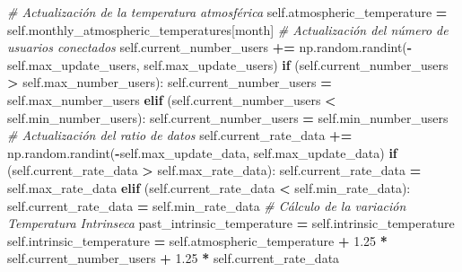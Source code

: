 \documentclass[
]{book}
\newenvironment{Shaded}{\begin{snugshade}}{\end{snugshade}}
\newcommand{\CommentTok}[1]{\textcolor[rgb]{0.56,0.35,0.01}{\textit{#1}}}
\newcommand{\ControlFlowTok}[1]{\textcolor[rgb]{0.13,0.29,0.53}{\textbf{#1}}}
\newcommand{\FloatTok}[1]{\textcolor[rgb]{0.00,0.00,0.81}{#1}}
\newcommand{\NormalTok}[1]{#1}
\newcommand{\OperatorTok}[1]{\textcolor[rgb]{0.81,0.36,0.00}{\textbf{#1}}}
\newcommand{\VariableTok}[1]{\textcolor[rgb]{0.00,0.00,0.00}{#1}}
\begin{document}
\begin{Shaded}
\begin{Highlighting}[]
        \CommentTok{\# Actualización de la temperatura atmosférica}
        \VariableTok{self}\NormalTok{.atmospheric\_temperature }\OperatorTok{=} \VariableTok{self}\NormalTok{.monthly\_atmospheric\_temperatures[month]}
        \CommentTok{\# Actualización del número de usuarios conectados}
        \VariableTok{self}\NormalTok{.current\_number\_users }\OperatorTok{+=}\NormalTok{ np.random.randint(}\OperatorTok{{-}}\VariableTok{self}\NormalTok{.max\_update\_users,}
                                                       \VariableTok{self}\NormalTok{.max\_update\_users)}
        \ControlFlowTok{if}\NormalTok{ (}\VariableTok{self}\NormalTok{.current\_number\_users }\OperatorTok{\textgreater{}} \VariableTok{self}\NormalTok{.max\_number\_users):}
            \VariableTok{self}\NormalTok{.current\_number\_users }\OperatorTok{=} \VariableTok{self}\NormalTok{.max\_number\_users}
        \ControlFlowTok{elif}\NormalTok{ (}\VariableTok{self}\NormalTok{.current\_number\_users }\OperatorTok{\textless{}} \VariableTok{self}\NormalTok{.min\_number\_users):}
            \VariableTok{self}\NormalTok{.current\_number\_users }\OperatorTok{=} \VariableTok{self}\NormalTok{.min\_number\_users}
        \CommentTok{\# Actualización del ratio de datos}
        \VariableTok{self}\NormalTok{.current\_rate\_data }\OperatorTok{+=}\NormalTok{ np.random.randint(}\OperatorTok{{-}}\VariableTok{self}\NormalTok{.max\_update\_data,}
                                                    \VariableTok{self}\NormalTok{.max\_update\_data)}
        \ControlFlowTok{if}\NormalTok{ (}\VariableTok{self}\NormalTok{.current\_rate\_data }\OperatorTok{\textgreater{}} \VariableTok{self}\NormalTok{.max\_rate\_data):}
            \VariableTok{self}\NormalTok{.current\_rate\_data }\OperatorTok{=} \VariableTok{self}\NormalTok{.max\_rate\_data}
        \ControlFlowTok{elif}\NormalTok{ (}\VariableTok{self}\NormalTok{.current\_rate\_data }\OperatorTok{\textless{}} \VariableTok{self}\NormalTok{.min\_rate\_data):}
            \VariableTok{self}\NormalTok{.current\_rate\_data }\OperatorTok{=} \VariableTok{self}\NormalTok{.min\_rate\_data}
        \CommentTok{\# Cálculo de la variación Temperatura Intrinseca}
\NormalTok{        past\_intrinsic\_temperature }\OperatorTok{=} \VariableTok{self}\NormalTok{.intrinsic\_temperature}
        \VariableTok{self}\NormalTok{.intrinsic\_temperature }\OperatorTok{=} \VariableTok{self}\NormalTok{.atmospheric\_temperature}
                                     \OperatorTok{+} \FloatTok{1.25} \OperatorTok{*} \VariableTok{self}\NormalTok{.current\_number\_users}
                                     \OperatorTok{+} \FloatTok{1.25} \OperatorTok{*} \VariableTok{self}\NormalTok{.current\_rate\_data}

\end{Highlighting}
\end{Shaded}
\end{document}

